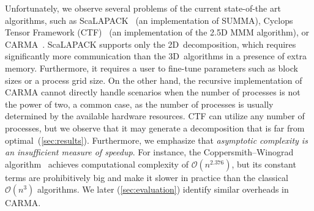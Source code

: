 \documentclass[sigplan,review,anonymous,10pt]{acmart}\settopmatter{printfolios=true,printccs=false,printacmref=false}
\newcommand\mac[1]{\textcolor{red}{[Mac: #1]}}
\begin{document}
Unfortunately, we observe several problems of the current state-of-the art
algorithms, such as ScaLAPACK~\cite{scalapack} (an implementation of
SUMMA), Cyclops Tensor Framework (CTF)~\cite{cyclops} (an implementation of the 
2.5D MMM algorithm), or CARMA~\cite{CARMA}. ScaLAPACK supports
only the 2D~decomposition, which requires significantly more communication than 
the 3D~algorithms in a presence of extra memory. Furthermore, it requires a 
user to
fine-tune parameters such as block sizes or a process
grid size. On the other hand, the recursive
implementation of CARMA cannot directly handle scenarios when the number of
processes is not the power of two, a common
case, as the number of processes is usually determined by the available
hardware resources.
CTF can utilize any number of processes, but we 
observe that it may generate a decomposition that is far from 
optimal~(\cref{sec:results}).  Furthermore, we emphasize that 
\emph{asymptotic 
complexity is an insufficient measure of speedup}. For instance, the
Coppersmith--Winograd algorithm~\cite{coppersmith} achieves computational
complexity of $\mathcal{O}(n^{2.376})$, but its constant terms are 
prohibitively big and
make it slower in practice than the classical $\mathcal{O}(n^{3})$ algorithms. 
We later (\cref{sec:evaluation}) identify similar overheads in CARMA. 




\end{document}
